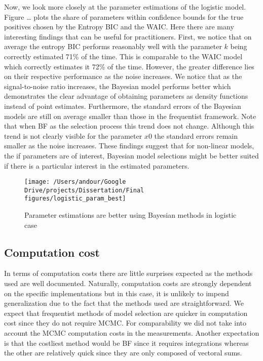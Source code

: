 \documentclass[]{article}
\begin{document}
Now, we look more closely at the parameter estimations of the logistic
model. Figure \ldots{} plots the share of parameters within confidence
bounds for the true positives chosen by the Entropy BIC and the WAIC.
Here there are many interesting findings that can be useful for
practitioners. First, we notice that on average the entropy BIC performs
reasonably well with the parameter \(k\) being correctly estimated 71\%
of the time. This is comparable to the WAIC model which correctly
estimates it 72\% of the time. However, the greater difference lies on
their respective performance as the noise increases. We notice that as
the signal-to-noise ratio increases, the Bayesian model performs better
which demonstrates the clear advantage of obtaining parameters as
density functions instead of point estimates. Furthermore, the standard
errors of the Bayesian models are still on average smaller than those in
the frequentist framework. Note that when BF as the selection process
this trend does not change. Although this trend is not clearly visible
for the parameter \(x0\) the standard errors remain smaller as the noise
increases. These findings suggest that for non-linear models, the if
parameters are of interest, Bayesian model selections might be better
suited if there is a particular interest in the estimated parameters.

\begin{figure}

{\centering \texttt{[image: /Users/andour/Google Drive/projects/Dissertation/Final figures/logistic\_param\_best]} 

}

\caption{Parameter estimations are better using Bayesian methods in logistic case}\label{fig:unnamed-chunk-6}
\end{figure}

\hypertarget{computation-cost}{%
\subsection{Computation cost}\label{computation-cost}}

In terms of computation costs there are little surprises expected as the
methods used are well documented. Naturally, computation costs are
strongly dependent on the specific implementations but in this case, it
is unlikely to impend generalization due to the fact that the methods
used are straightforward. We expect that frequentist methods of model
selection are quicker in computation cost since they do not require
MCMC. For comparability we did not take into account the MCMC
computation costs in the measurements. Another expectation is that the
costliest method would be BF since it requires integrations whereas the
other are relatively quick since they are only composed of vectoral
sums.
\end{document}
